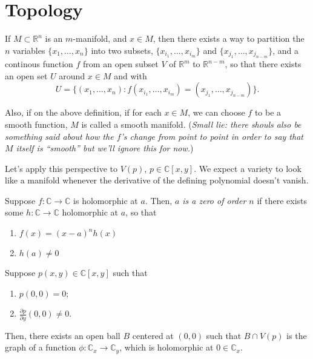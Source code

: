 \newpage
\section{Topology}

\begin{prop}
	If $M \subset \mathbb{R}^n$ is an $m$-manifold, and $x \in M$, then there exists a way to partition the  $n$ variables $\{x_1, \dots, x_n\}$ into two subsets, $\{x_{i_1}, \dots, x_{i_m}\}$ and $\{x_{j_1}, \dots, x_{j_{n-m}}\}$, and a continous function $f$ from an open subset $V$ of $\mathbb{R}^m$ to $\mathbb{R}^{n-m}$, so that there exists an open set $U$ around $x \in M$ and with \[U = \{(x_1, \dots, x_n) : f(x_{i_1}, \dots, x_{i_m}) = (x_{j_1}, \dots, x_{j_{n-m}})\}.\]
\end{prop}

\begin{defn}
	Also, if on the above definition, if for each $x \in M$, we can choose $f$ to be a smooth function, $M$ is called a smooth manifold.
	(\emph{Small lie: there shouls also be something said about how the $f$'s change from point to point in order to say that $M$ itself is ``smooth'' but we'll ignore this for now.})
\end{defn}

Let's apply this perspective to $V(p)$, $p \in \mathbb{C}[x, y]$. We expect a variety to look like a manifold whenever the derivative of the defining polynomial doesn't vanish.

\begin{defn}
	Suppose $f: \mathbb{C} \to \mathbb{C}$ is holomorphic at $a$. Then, \emph{$a$ is a zero of order $n$} if there exists some $h: \mathbb{C} \to \mathbb{C}$ holomorphic at $a$, so that
	\begin{enumerate}
		\item $f(x) = (x-a)^n h(x)$
		\item $h(a) \neq 0$
	\end{enumerate}
\end{defn}

\begin{thm}\label{thm:graph-holomorphic}
	Suppose $p(x, y) \in \mathbb{C}[x, y]$ such that
	\begin{enumerate}[label = (\alph*)]
		\item $p(0, 0) = 0$;
		\item $\frac{\partial p}{\partial y} (0, 0) \neq 0$.
	\end{enumerate}

	Then, there exists an open ball $B$ centered at $(0, 0)$ such that $B \cap V(p)$ is the graph of a function $\phi: \mathbb{C}_x \to \mathbb{C}_y$, which is holomorphic at $0 \in \mathbb{C}_x$.
\end{thm}
